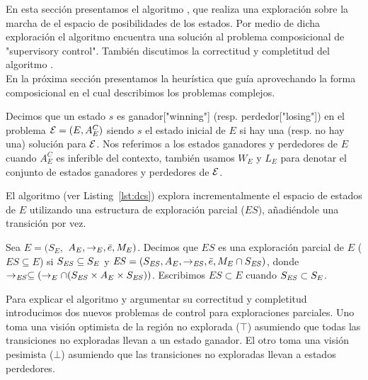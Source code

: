 En esta sección presentamos el algoritmo \DCS, que realiza una exploración sobre la marcha de el espacio de posibilidades de los estados. Por medio de dicha exploración el algoritmo encuentra una solución al problema composicional de "supervisory control". También discutimos la correctitud y completitud del algoritmo \DCS. \\
En la próxima sección presentamos la heurística que guía \DCS aprovechando la forma composicional en el cual describimos los problemas complejos.





\begin{notation}
Decimos que un estado $s$ es ganador["winning"] (resp. perdedor["losing"]) en el problema $\mathcal{E} = 
(E, A_E^C)$ siendo $s$ el estado inicial de $E$ si hay una (resp. no hay una) solución para $\mathcal{E}$. Nos referimos a los estados ganadores y perdedores de $E$ cuando $A_E^C$ es inferible del contexto, también usamos $W_E$ y $L_E$ para denotar el conjunto de estados ganadores y perdedores de $\mathcal{E}$.
\end{notation}

El algoritmo (ver Listing~\ref{lst:dcs}) explora incrementalmente el espacio de estados de $E$ utilizando una estructura de exploración parcial ($ES$), añadiéndole una transición por vez.


\begin{definition}
 \label{def:unexploredTo}
Sea $E = (S_E,$ $A_E, \rightarrow_E, \bar{e}, M_E)$. Decimos que $ES$ es una exploración parcial de $E$ ($ES \subseteq E$) si $S_{\mathit{ES}} \subseteq 
S_E$ y $\mathit{ES} = (S_{\mathit{ES}},A_E, \rightarrow_{\mathit{ES}},\bar{e},M_E 
\cap S_{\mathit{ES}})$, donde $ \rightarrow_{\mathit{ES}} \subseteq (\rightarrow_E \cap 
(S_{\mathit{ES}} \times A_E \times S_{\mathit{ES}}))$. Escribimos $ES \subset E$ cuando $S_{\mathit{ES}} \subset S_E$.
\end{definition}

Para explicar el algoritmo y argumentar su correctitud y completitud introducimos dos nuevos problemas de control para exploraciones parciales. Uno toma una visión optimista de la región no explorada ($\top$) asumiendo que todas las transiciones no exploradas llevan a un estado ganador. El otro toma una visión pesimista ($\bot$) asumiendo que las transiciones no exploradas llevan a estados perdedores.

